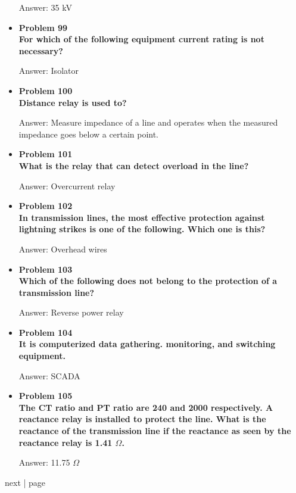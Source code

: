 \documentclass{article}
\begin{document}
\begin{center}
\begin{itemize}
    Answer: 35 kV

    \item\textbf{Problem 99\\%
    For which of the following equipment current rating is not necessary?}

    Answer: Isolator

    \item\textbf{Problem 100\\%
    Distance relay is used to?}

    Answer: Measure impedance of a line and operates when the measured impedance goes below a certain point.

    \item\textbf{Problem 101\\%
    What is the relay that can detect overload in the line?}

    Answer: Overcurrent relay

    \item\textbf{Problem 102\\%
    In transmission lines, the most effective protection against lightning strikes is one of the following. Which one is this?}

    Answer: Overhead wires

    \item\textbf{Problem 103\\%
    Which of the following does not belong to the protection of a transmission line?}

    Answer: Reverse power relay

    \item\textbf{Problem 104\\%
    It is computerized data gathering. monitoring, and switching equipment.}

    Answer: SCADA

    \item\textbf{Problem 105\\%
    The CT ratio and PT ratio are 240 and 2000 respectively. A reactance relay is installed to protect the line. What is the reactance of the transmission line if the reactance as seen by the reactance relay is 1.41 $\Omega$.}

    Answer: 11.75 $\Omega$

    
\end{itemize}
\newpage
next | page
\end{center}
\end{document}
